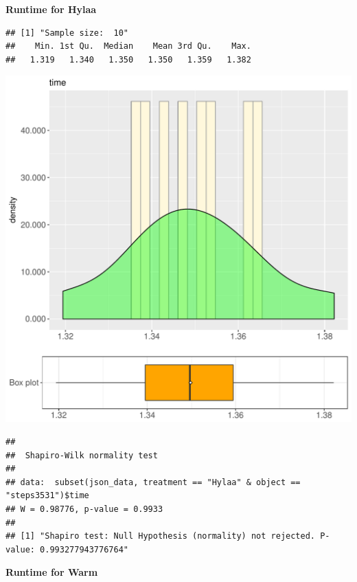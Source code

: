 \documentclass{article}\usepackage[]{graphicx}\usepackage[]{color}
\makeatletter
\def\maxwidth{ %
  \ifdim\Gin@nat@width>\linewidth
    \linewidth
  \else
    \Gin@nat@width
  \fi
}
\newenvironment{kframe}{%
 \def\at@end@of@kframe{}%
 \ifinner\ifhmode%
  \def\at@end@of@kframe{\end{minipage}}%
  \begin{minipage}{\columnwidth}%
 \fi\fi%
 \def\FrameCommand##1{\hskip\@totalleftmargin \hskip-\fboxsep
 \colorbox{shadecolor}{##1}\hskip-\fboxsep
     \hskip-\linewidth \hskip-\@totalleftmargin \hskip\columnwidth}%
 \MakeFramed {\advance\hsize-\width
   \@totalleftmargin\z@ \linewidth\hsize
   \@setminipage}}%
 {\par\unskip\endMakeFramed%
 \at@end@of@kframe}
\newenvironment{knitrout}{}{} %
\makeatother
\begin{document}
 \textbf{Runtime for Hylaa}
\begin{knitrout}
\color{fgcolor}\begin{kframe}
\begin{verbatim}
## [1] "Sample size:  10"
##    Min. 1st Qu.  Median    Mean 3rd Qu.    Max. 
##   1.319   1.340   1.350   1.350   1.359   1.382
\end{verbatim}
\end{kframe}
\includegraphics[width=\maxwidth]{figure/RH1_Hylaa_steps3531-1} 
\begin{kframe}\begin{verbatim}
## 
## 	Shapiro-Wilk normality test
## 
## data:  subset(json_data, treatment == "Hylaa" & object == "steps3531")$time
## W = 0.98776, p-value = 0.9933
## 
## [1] "Shapiro test: Null Hypothesis (normality) not rejected. P-value: 0.993277943776764"
\end{verbatim}
\end{kframe}
\end{knitrout}
 \textbf{Runtime for Warm}
\end{document}
